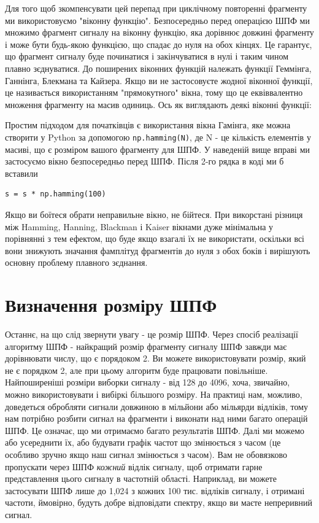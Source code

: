 Для того щоб зкомпенсувати цей перепад при циклічному повторенні
фрагменту ми використовуємо "віконну функцію". Безпосередньо перед
операцією ШПФ ми множимо фрагмент сигналу на віконну функцію, яка
дорівнює довжині фрагменту і може бути будь-якою функцією, що спадає до
нуля на обох кінцях. Це гарантує, що фрагмент сигналу буде починатися і
закінчуватися в нулі і таким чином плавно з\textquotesingle єднуватися.
До поширених віконних функцій належать функції Геммінга, Ганнінга,
Блекмана та Кайзера. Якщо ви не застосовуєте жодної віконної функції, це
називається використанням "прямокутного" вікна, тому що це еквіввалентно
множення фрагменту на масив одиниць. Ось як виглядають деякі віконні
функції:

\href{../_images/windows.svg}{}

Простим підходом для початківців є використання вікна Гамінга, яке можна
створити у Python за допомогою \texttt{np.hamming(N)}, де N - це
кількість елементів у масиві, що є розміром вашого фрагменту для ШПФ. У
наведеній вище вправі ми застосуємо вікно безпосередньо перед ШПФ. Після
2-го рядка в коді ми б вставили

\begin{Verbatim}[breaklines=true,breakanywhere=true,fontsize=\small]
s = s * np.hamming(100)
\end{Verbatim}

Якщо ви боїтеся обрати неправильне вікно, не бійтеся. При викорстані
різниця між Hamming, Hanning, Blackman і Kaiser вікнами дуже мінімальна
у порівнянні з тем ефектом, що буде якщо взагалі їх не використати,
оскільки всі вони знижують значання фамплітуд фрагментів до нуля з обох
боків і вирішують основну проблему плавного з\textquotesingle єднання.

\section{Визначення розміру
ШПФ}\label{ux432ux438ux437ux43dux430ux447ux435ux43dux43dux44f-ux440ux43eux437ux43cux456ux440ux443-ux448ux43fux444}

Останнє, на що слід звернути увагу - це розмір ШПФ. Через спосіб
реалізації алгоритму ШПФ - найкращий розмір фрагменту сигналу ШПФ завжди
має дорівнювати числу, що є порядоком 2. Ви можете використовувати
розмір, який не є порядком 2, але при цьому алгоритм буде працювати
повільніше. Найпоширеніші розміри виборки сигналу - від 128 до 4096,
хоча, звичайно, можно використовувати і вибіркі більшого розміру. На
практиці нам, можливо, доведеться обробляти сигнали довжиною в мільйони
або мільярди відліків, тому нам потрібно розбити сигнал на фрагменти і
виконати над ними багато операцій ШПФ. Це означає, що ми отримаємо
багато результатів ШПФ. Далі ми можемо або усереднити їх, або будувати
графік частот що змінюється з часом (це особливо зручно якщо наш сигнал
змінюється з часом). Вам не обов\textquotesingle язково пропускати через
ШПФ \emph{кожний} відлік сигналу, щоб отримати гарне представлення цього
сигналу в частотній області. Наприклад, ви можете застосувати ШПФ лише
до 1,024 з кожних 100 тис. відліків сигналу, і отримані частоти,
ймовірно, будуть добре відповідати спектру, якщо ви маєте непреривний
сигнал.

